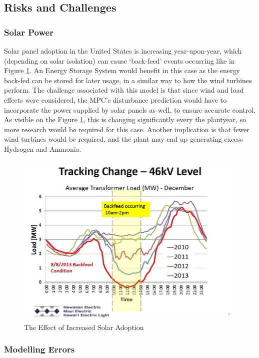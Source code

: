 \subsection{Risks and Challenges}

\subsubsection{Solar Power}

Solar panel adoption in the United States is increasing year-upon-year, which (depending on solar isolation) can cause `back-feed' events occurring like in Figure \ref{fig:solar}.
An Energy Storage System would benefit in this case as the energy back-fed can be stored for later usage, in a similar way to how the wind turbines perform.
The challenge associated with this model is that since wind and load effects were considered, the MPC's disturbance prediction would have to incorporate the power supplied by solar panels as well, to ensure accurate control.
As visible on the Figure \ref{fig:solar}, this is changing significantly every  the plantyear, so more research would be required for this case.
Another implication is that fewer wind turbines would be required, and the plant may end up generating excess Hydrogen and Ammonia.
\begin{figure}[htb]
\includegraphics[scale=0.3]{images/backfeed.jpg}
\caption{The Effect of Increased Solar Adoption}
\label{fig:solar}
\end{figure}

\subsubsection{Modelling Errors}

